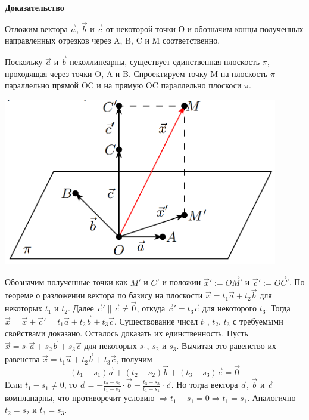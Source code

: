 \documentclass[a4paper]{article}
\begin{document}
\begin{hproof}
\textbf{Доказательство}

Отложим вектора $\vec{a}$, $\vec{b}$  и $\vec{c}$ от некоторой точки О и обозначим концы полученных направленных отрезков через A, B, C и M соответственно.

Поскольку $\vec{a}$ и $\vec{b}$ неколлинеарны, существует единственная плоскость $\pi$, проходящая через точки O, A и B. Спроектируем точку M на плоскость $\pi$ параллельно прямой OC и  на прямую OC параллельно плоскоси $\pi$. 

\includegraphics[width=12cm]{t3}

Обозначим полученные точки как $M'$ и $C'$ и положии $\vec{x}' := \overrightarrow{OM}'$ и $\vec{c}' := \overrightarrow{OC}'$. По теореме о разложении вектора по базису на плоскости  $\vec{x} = t_1 \vec{a} + t_2 \vec{b}$ для некоторых $t_1$ и $t_2$. Далее $\vec{c}' \parallel \vec{c} \neq \vec{0}$, откуда $\vec{c}' = t_3 \vec{c}$ для некоторого $t_3$. Тогда $\vec{x} = \vec{x} + \vec{c}' = t_1 \vec{a} + t_2 \vec{b} + t_3 \vec{c}$. Существование чисел $t_1$, $t_2$, $t_3$ с требуемыми свойствами доказано.
Осталось доказать их единственность. Пусть $\vec{x} = s_1 \vec{a} + s_2 \vec{b} + s_3 \vec{c}$ для некоторых $s_1$, $s_2$ и $s_3$. Вычитая это равенство их равенства $\vec{x} = t_1 \vec{a} + t_2 \vec{b} + t_3 \vec{c}$, получим  
\begin{equation}
(t_1 -s_1) \vec{a} + (t_2 - s_2)\vec{b} + (t_3 - s_3) \vec{c} = \vec{0}
\end{equation}
Если $\displaystyle t_1 -s_1 \neq	0$, то $\vec{a} = - \frac{t_2 - s_2}{t_1 - s_1} \cdot \vec{b} - \frac{t_3 - s_3}{t_1 - s_1} \cdot \vec{c}$. Но тогда вектора $\vec{a}$, $\vec{b}$ и $\vec{c}$ компланарны, что противоречит условию $\Rightarrow t_1 - s_1 = 0 \Rightarrow t_1 = s_1$. Аналогично $t_2 = s_2$ и $t_3 = s_3$.
\end{hproof}
\end{document}
